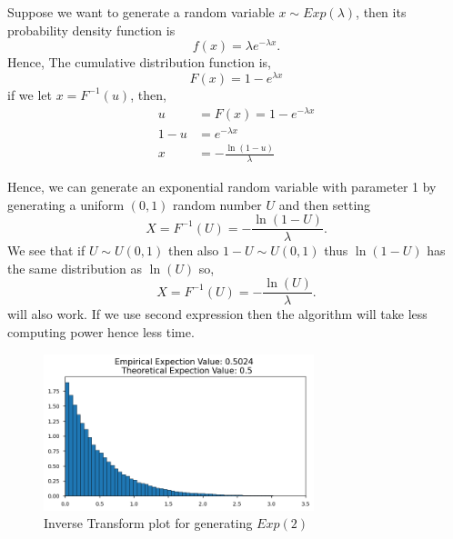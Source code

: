 \begin{example}
    \label{exponential distribution}
    Suppose we want to generate a random variable $x\sim Exp(\lambda)$, then its probability density function is 
    \[
    f(x) = \lambda e^{-\lambda x}.
    \] 
    Hence, The cumulative distribution function is,
    \[
    F(x) = 1-e^{\lambda x}
    \] 
    if we let $x=F^{-1}(u)$, then,
    \begin{align*}
        u&=F(x)=1-e^{-\lambda x} \\ 
         1-u &= e ^{-\lambda x}\\ 
         x &= - \frac{\ln(1-u)}{\lambda}
    \end{align*}
    
    Hence, we can generate an exponential random variable with parameter 1 by generating a uniform $(0,1)$ random number $U$ and then setting
    \[
    X = F^{-1}(U) = -\frac{\ln(1-U)}{\lambda}.
    \] 
    We see that if $U\sim U(0,1)$ then also $1-U\sim U(0,1)$ thus  $\ln(1-U)$ has the same distribution as  $\ln(U)$ so,
    \[
    X = F^{-1}(U) = -\frac{\ln(U)}{\lambda}.
    \] 
    will also work. If we use second expression then the algorithm will take less computing power hence less time.
    \begin{figure}[H]
        
        \centering
        \includegraphics[width=0.7\textwidth]{images/exp_ITA.png}
        \caption{Inverse Transform plot for generating $Exp(2)$}
    \end{figure}
\end{example}
